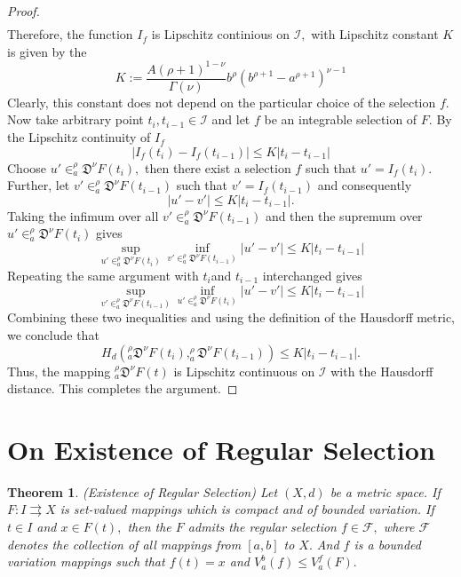 \documentclass{amsproc}
\newtheorem{theorem}{Theorem}[section]
\theoremstyle{definition}
\theoremstyle{remark}
\numberwithin{equation}{section}
\begin{document}
\begin{proof}
\begin{equation*}
\begin{aligned}
     \end{aligned}
 \end{equation*}
 Therefore, the function $I_f$ is Lipschitz continious on $\mathcal{I},$ with Lipschitz constant $K$ is given by the 
 \[ K:=\frac{A(\rho+1)^{1-\nu}}{\Gamma(\nu)} b^\rho (b^{\rho+1}-a^{\rho+1})^{\nu-1} \] 
 Clearly, this constant does not depend on the particular choice of the selection $f.$ Now take arbitrary point $t_i,t_{i-1}\in \mathcal{I}$ and let $f$ be an integrable selection of $F.$ By the Lipschitz continuity of $I_f$ 
 \[ |I_f(t_i)-I_f(t_{i-1})|\le K|t_i-t_{i-1
 }|\] 
 Choose $u'\in _a^\rho\mathfrak{D}^\nu F(t_i),$ then there exist a selection $f$ such that $u'=I_f(t_i).$ Further, let $v' \in _a^\rho\mathfrak{D}^\nu F(t_{i-1})$  such that $v'=I_f(t_{i-1})$ and consequently 
 \[ |u'-v'| \le K|t_i-t_{i-1}|.\]
 Taking the infimum over all $v'\in _a^\rho\mathfrak{D}^\nu F(t_{i-1})$ and then the supremum over $u'\in _a^\rho\mathfrak{D}^\nu F(t_i)$ gives 
 \[ \sup_{u'\in _a^\rho\mathfrak{D}^\nu F(t_i)} \inf_{v'\in _a^\rho\mathfrak{D}^\nu F(t_{i-1})} |u'-v'| \le K|t_i-t_{i-1}| \]
 Repeating the same argument with $t_i$and $t_{i-1}$ interchanged gives 
 \[ \sup_{v'\in _a^\rho\mathfrak{D}^\nu F(t_{i-1})} \inf_{u'\in _a^\rho\mathfrak{D}^\nu F(t_i)} |u'-v'| \le K|t_i-t_{i-1}| \]
 Combining these two inequalities and using the definition of the Hausdorff metric, we conclude that
 \[ H_d(_a^\rho\mathfrak{D}^\nu F(t_i),_a^\rho\mathfrak{D}^\nu F(t_{i-1}))\le K|t_i-t_{i-1}|.\]
 Thus, the mapping $_a^\rho\mathfrak{D}^\nu F(t)$ is Lipschitz continuous on $\mathcal{I}$ with the Hausdorff distance. This completes the argument. 
 
\end{proof} 
 
\section{On Existence of Regular Selection} \label{sec5}

\begin{theorem}\cite[Theorem 3]{Belov} \label{selec} (Existence of Regular Selection) Let $(X,d)$ be a metric space. If $F:I \rightrightarrows X$ is set-valued mappings which is compact and of bounded variation. If $t \in I$ and $x\in F(t),$ then the $F$ admits the regular selection $f\in \mathcal{F},$ where $\mathcal{F}$ denotes the collection of all mappings from $[a,b]$ to $X.$ And $f$ is a bounded variation mappings such that $f(t)=x$ and $V_a^b(f)\le V_a^f(F).$
\end{theorem}
\end{document}
